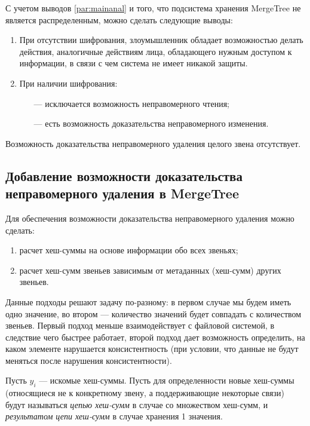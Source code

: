 С учетом выводов \ref{par:mainanal} и того, что подсистема хранения MergeTree не является распределенным, можно сделать следующие выводы:
\begin{enumerate}
	\item При отсутствии шифрования, злоумышленник обладает возможностью делать действия, аналогичные действиям лица, обладающего нужным доступом к информации, в связи с чем система не имеет никакой защиты.
	\item При наличии шифрования:
	\begin{itemize}
		\item [---] исключается возможность неправомерного чтения;
		\item [---] есть возможность доказательства неправомерного изменения.
	\end{itemize}
\end{enumerate}

Возможность доказательства неправомерного удаления целого звена отсутствует.

\subsection{Добавление возможности доказательства неправомерного удаления в MergeTree}

Для обеспечения возможности доказательства неправомерного удаления можно сделать:
\begin{enumerate}
	\item расчет хеш-суммы на основе информации обо всех звеньях;
	\item расчет хеш-сумм звеньев зависимым от метаданных (хеш-сумм) других звеньев.
\end{enumerate}

Данные подходы решают задачу по-разному: в первом случае мы будем иметь одно значение, во втором --- количество значений будет совпадать с количеством звеньев. Первый подход меньше взаимодействует с файловой системой, в следствие чего быстрее работает, второй подход дает возможность определить, на каком элементе нарушается консистентность (при условии, что данные не будут меняться после нарушения консистентности).

Пусть $y_i$ --- искомые хеш-суммы. Пусть для определенности новые хеш-суммы (относящиеся не к конкретному звену, а поддерживающие некоторые связи) будут называться \textit{цепью хеш-сумм} в случае со множеством хеш-сумм, и \textit{результатом цепи хеш-сумм} в случае хранения 1 значения.

\pagebreak

